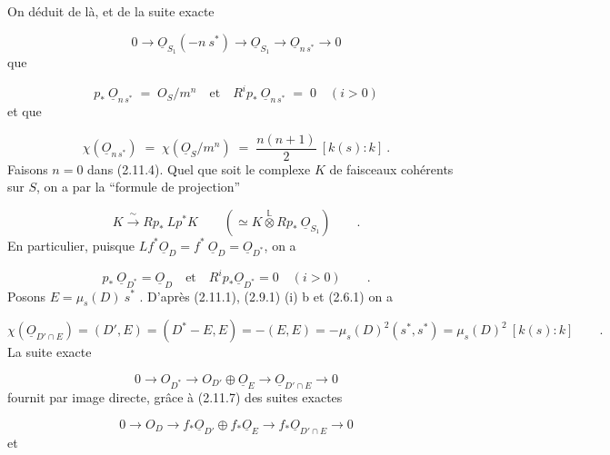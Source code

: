 
On déduit de là, et de la suite exacte

\begin{equation*}
0 \longrightarrow \underline{O}_{S_1}(-n\ s^*) \longrightarrow \underline{O}_{S_1} \longrightarrow \underline{O}_{n\,s^*} \longrightarrow 0
\end{equation*}
que

\begin{equation}\tag{2.11.5}
p_*\ \underline{O}_{n\,s^*} \;=\; O_S/m^n \quad \text{et} \quad R^i p_*\ \underline{O}_{n\,s^*} \;=\; 0 \quad (i > 0)
\end{equation}
et que

\begin{equation}\tag{2.11.6}
\chi(\underline{O}_{n\,s^*}) \;=\; \chi(\underline{O}_S/m^n) \;=\; \frac{n(n+1)}{2} \ [k(s):k] \ .
\end{equation}
Faisons $n = 0$ dans (2.11.4). Quel que soit le complexe $K$ de faisceaux cohérents sur $S$, on a par la ``formule de projection''

\begin{equation*}
K \xrightarrow{\ \sim\ } Rp_*\ Lp^*K \qquad (\simeq K \overset{\mathbb{L}}{\otimes} Rp_*\ \underline{O}_{S_1}) \qquad .
\end{equation*}
En particulier, puisque $Lf^*\underline{O}_D = f^*\ \underline{O}_D = \underline{O}_{D^*}$, on a

\begin{equation}\tag{2.11.7}
p_*\ \underline{O}_{D^*} = \underline{O}_D \quad \text{et} \quad R^i p_*\underline{O}_{D^*} = 0 \quad (i>0) \qquad .
\end{equation}
Posons $E = \mu_s(D)\ s^*$ . D'après (2.11.1), (2.9.1) (i) b et (2.6.1) on a

\begin{equation}\tag{2.11.8}
\chi(\underline{O}_{D'\cap E}) = (D',E) = (D^* - E,E) = -(E,E) = -\mu_s(D)^2(s^*,s^*) = \mu_s(D)^2\ [k(s) : k] \qquad .
\end{equation}
La suite exacte

\begin{equation*}
0 \longrightarrow O_{D^*} \longrightarrow O_{D'} \oplus \underline{O}_E \longrightarrow \underline{O}_{D'\cap E} \longrightarrow 0
\end{equation*}
fournit par image directe, grâce à (2.11.7) des suites exactes

\begin{equation*}
0 \longrightarrow O_D \longrightarrow f_*\underline{O}_{D'} \oplus f_*\underline{O}_E \longrightarrow f_*\underline{O}_{D'\cap E} \longrightarrow 0
\end{equation*}
et

